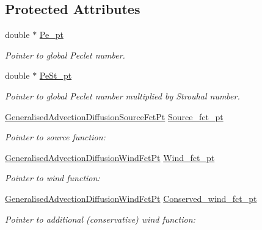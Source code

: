\subsection*{Protected Attributes}
\begin{DoxyCompactItemize}
\item 
double $\ast$ \hyperlink{classoomph_1_1GeneralisedAdvectionDiffusionEquations_a1d8bbbe41954ea99f8eec70882f84932}{Pe\+\_\+pt}
\begin{DoxyCompactList}\small\item\em Pointer to global Peclet number. \end{DoxyCompactList}\item 
double $\ast$ \hyperlink{classoomph_1_1GeneralisedAdvectionDiffusionEquations_a8f77e17bba1c7666679abf0fa6150733}{Pe\+St\+\_\+pt}
\begin{DoxyCompactList}\small\item\em Pointer to global Peclet number multiplied by Strouhal number. \end{DoxyCompactList}\item 
\hyperlink{classoomph_1_1GeneralisedAdvectionDiffusionEquations_ad65d34bc0348f8b297c185d1772eafd9}{Generalised\+Advection\+Diffusion\+Source\+Fct\+Pt} \hyperlink{classoomph_1_1GeneralisedAdvectionDiffusionEquations_a7ceace6c5f2b7d02e118d0cdd9b69125}{Source\+\_\+fct\+\_\+pt}
\begin{DoxyCompactList}\small\item\em Pointer to source function\+: \end{DoxyCompactList}\item 
\hyperlink{classoomph_1_1GeneralisedAdvectionDiffusionEquations_ac5a63eb03aee5957e7b14a4578423cfc}{Generalised\+Advection\+Diffusion\+Wind\+Fct\+Pt} \hyperlink{classoomph_1_1GeneralisedAdvectionDiffusionEquations_a50dd69aaff906d837a29171c6b1690c9}{Wind\+\_\+fct\+\_\+pt}
\begin{DoxyCompactList}\small\item\em Pointer to wind function\+: \end{DoxyCompactList}\item 
\hyperlink{classoomph_1_1GeneralisedAdvectionDiffusionEquations_ac5a63eb03aee5957e7b14a4578423cfc}{Generalised\+Advection\+Diffusion\+Wind\+Fct\+Pt} \hyperlink{classoomph_1_1GeneralisedAdvectionDiffusionEquations_a56787086fb90a6af6e7e2e3e4e1e3a59}{Conserved\+\_\+wind\+\_\+fct\+\_\+pt}
\begin{DoxyCompactList}\small\item\em Pointer to additional (conservative) wind function\+: \end{DoxyCompactList}\item 

\end{DoxyCompactItemize}
